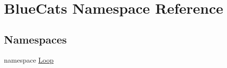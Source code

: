 \hypertarget{namespace_blue_cats}{}\section{Blue\+Cats Namespace Reference}
\label{namespace_blue_cats}
\subsection*{Namespaces}
\begin{DoxyCompactItemize}
\item 
namespace \mbox{\hyperlink{namespace_blue_cats_1_1_loop}{Loop}}
\end{DoxyCompactItemize}
